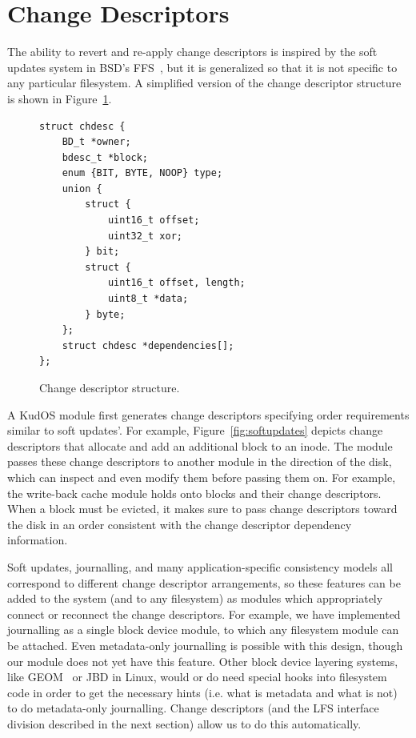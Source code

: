 \preparagraphspacing{}
\section*{Change Descriptors}
\label{sec:chdescs}

The ability to revert and re-apply change descriptors is inspired by the soft
updates system in BSD's FFS~\cite{ganger00soft}, but it is generalized so that
it is not specific to any particular filesystem. A simplified version of the
change descriptor structure is shown in Figure~\ref{fig:chdesc}.

\begin{figure}
{\footnotesize
\begin{verbatim}
struct chdesc {
    BD_t *owner;
    bdesc_t *block;
    enum {BIT, BYTE, NOOP} type;
    union {
        struct {
            uint16_t offset;
            uint32_t xor;
        } bit;
        struct {
            uint16_t offset, length;
            uint8_t *data;
        } byte;
    };
    struct chdesc *dependencies[];
};
\end{verbatim}
}
\vspace{-14pt}
\caption{\label{fig:chdesc} Change descriptor structure.}
\end{figure}

A KudOS module first generates change descriptors specifying order
requirements similar to soft updates'. For example,
Figure~\ref{fig:softupdates} depicts change descriptors that allocate
and add an additional block to an inode.
%
The module passes these change descriptors to another module in the
direction of the disk, which can inspect and even modify them before
passing them on.
%
For example, the write-back cache module holds onto blocks and their
change descriptors.
%
When a block must be evicted, it makes sure to pass change descriptors
toward the disk in an order consistent with the change descriptor
dependency information.

Soft updates, journalling, and many application-specific consistency
models all correspond to different change descriptor arrangements, so
these features can be added to the system (and to any filesystem) as
modules which appropriately connect or reconnect the change
descriptors. For example, we have implemented journalling as a single
block device module, to which any filesystem module can be
attached. Even metadata-only journalling is possible with this design,
though our module does not yet have this feature.  Other block device
layering systems, like GEOM~\cite{geom} or JBD in Linux, would or do
need special hooks into filesystem code in order to get the necessary
hints (i.e. what is metadata and what is not) to do metadata-only
journalling. Change descriptors (and the LFS interface division
described in the next section) allow us to do this automatically.

